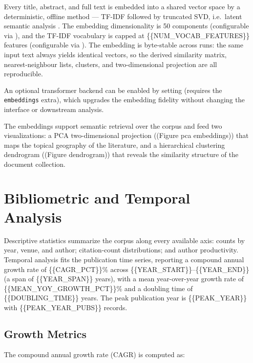 \documentclass[
]{article}
\begin{document}
Every title, abstract, and full text is embedded into a shared vector
space by a deterministic, offline method --- TF-IDF followed by
truncated SVD, i.e.~latent semantic analysis
\citep{deerwester1990indexing}. The embedding dimensionality is 50
components (configurable via
), and the TF-IDF
vocabulary is capped at \{\{NUM\_VOCAB\_FEATURES\}\} features
(configurable via ).
The embedding is byte-stable across runs: the same input text always
yields identical vectors, so the derived similarity matrix,
nearest-neighbour lists, clusters, and two-dimensional projection are
all reproducible.

An optional transformer backend can be enabled by setting
 (requires the
\texttt{embeddings} extra), which upgrades the embedding fidelity
without changing the interface or downstream analysis.

The embeddings support semantic retrieval over the corpus and feed two
visualizations: a PCA two-dimensional projection ((Figure pca
embeddings)) that maps the topical geography of the literature, and a
hierarchical clustering dendrogram ((Figure dendrogram)) that reveals
the similarity structure of the document collection.

\newpage

\section{Bibliometric and Temporal
Analysis}\label{bibliometric-and-temporal-analysis}

Descriptive statistics summarize the corpus along every available axis:
counts by year, venue, and author; citation-count distributions; and
author productivity. Temporal analysis fits the publication time series,
reporting a compound annual growth rate of \{\{CAGR\_PCT\}\}\% across
\{\{YEAR\_START\}\}--\{\{YEAR\_END\}\} (a span of \{\{YEAR\_SPAN\}\}
years), with a mean year-over-year growth rate of
\{\{MEAN\_YOY\_GROWTH\_PCT\}\}\% and a doubling time of
\{\{DOUBLING\_TIME\}\} years. The peak publication year is
\{\{PEAK\_YEAR\}\} with \{\{PEAK\_YEAR\_PUBS\}\} records.

\subsection{Growth Metrics}\label{growth-metrics}

The compound annual growth rate (CAGR) is computed as:
\end{document}
